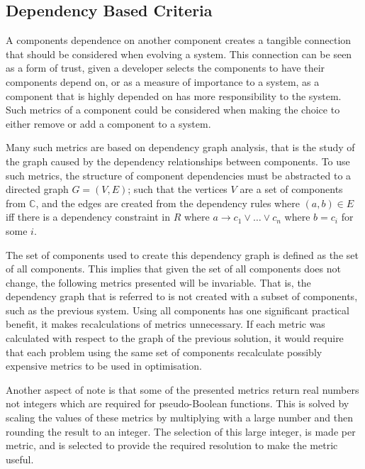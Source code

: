 \subsection{Dependency Based Criteria}
A components dependence on another component creates a tangible connection that should be considered when evolving a system.
This connection can be seen as a form of trust, given a developer selects the components to have their components depend on,
or as a measure of importance to a system, as a component that is highly depended on has more responsibility to the system.
Such metrics of a component could be considered when making the choice to either remove or add a component to a system.

Many such metrics are based on dependency graph analysis, that is the study of the graph caused by the dependency relationships between components. 
To use such metrics, the structure of component dependencies must be abstracted to a directed graph $G = (V,E)$;
such that the vertices $V$ are a set of components from $\mathbb{C}$, 
and the edges are created from the dependency rules where $(a,b) \in E$ iff there is a dependency constraint in $R$ 
where $a \rightarrow c_1 \vee \ldots \vee c_n$ where $b = c_i$ for some $i$.

The set of components used to create this dependency graph is defined as the set of all components.
This implies that given the set of all components does not change, the following metrics presented will be invariable.
That is, the dependency graph that is referred to is not created with a subset of components, such as the previous system.
Using all components has one significant practical benefit, it makes recalculations of metrics unnecessary.
If each metric was calculated with respect to the graph of the previous solution, 
it would require that each problem using the same set of components recalculate possibly expensive metrics to be used in optimisation.

Another aspect of note is that some of the presented metrics return real numbers not integers which are required for pseudo-Boolean functions.
This is solved by scaling the values of these metrics by multiplying with a large number and then rounding the result to an integer.
The selection of this large integer, is made per metric, and is selected to provide the required resolution to make the metric useful.

